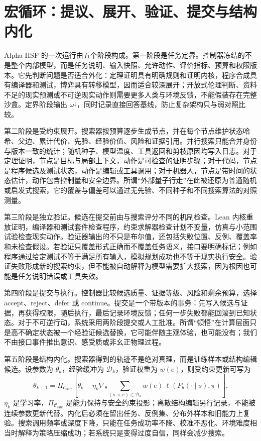 \section{宏循环：提议、展开、验证、提交与结构内化}
\label{sec:algorithmic_dynamics_macro_cycle}

Alpha-HSF 的一次运行由五个阶段构成。第一阶段是任务定界。控制器冻结的不是整个内部模型，而是任务说明、输入快照、允许动作、评价指标、预算和权限版本。它先判断问题是否适合外化：定理证明具有明确规则和证明内核，程序合成具有编译器和测试，博弈具有转移模型，因而适合较深展开；开放式伦理判断、资料不足的现实预测或不可逆现实动作则需要更多人类与环境反馈，不能假装存在完整沙盒。定界阶段输出 $\omega^{\downarrow}$，同时记录直接回答基线，防止复杂架构只与弱对照比较。

第二阶段是受约束展开。搜索器按预算逐步生成节点，并在每个节点维护状态哈希、父边、累计代价、先验、经验价值、风险和证据引用。并行搜索只能合并身份与版本一致的统计；随机种子、模型温度、工具返回和剪枝原因均写入日志。对于定理证明，节点是目标与局部上下文，动作是可检查的证明步骤；对于代码，节点是程序候选及测试状态，动作是编辑或工具调用；对于机器人，节点是带时间的状态估计，动作包含控制量和安全边界。所谓“外部量子行走”在此被还原为普通随机或启发式搜索，它的覆盖与偏差可以通过无先验、不同种子和不同搜索算法的对照测量。

第三阶段是独立验证。候选在提交前由与搜索评分不同的机制检查。Lean 内核重放证明，编译器和测试套件检查程序，约束求解器检查计划不变量，仿真与小范围试验检查现实动作。验证器输出的不只是布尔值，还包括失败位置、反例、覆盖率和未检查假设。若验证只覆盖形式正确而不覆盖任务语义，接口要明确标记；例如程序通过给定测试不等于满足所有输入，模拟规划成功也不等于现实执行安全。验证失败形成新的搜索约束，但不能被自动解释为模型需要扩大搜索，因为根因也可能是任务说明错误或工具失效。

第四阶段是提交与执行。控制器比较候选质量、证据等级、风险和剩余预算，选择 accept、reject、defer 或 continue。提交是一个带版本的事务：先写入候选与证据，再获得权限，随后执行，最后记录环境反馈；任何一步失败都能回滚到已知状态。对于不可逆行动，系统采用两阶段提交或人工批准。所谓“顿悟”在计算层面只是高不确定状态被一个经验证候选替换，它可能伴随主观体验，也可能没有；我们不由接口事件推出意识、感受质或非幺正物理过程。

第五阶段是结构内化。搜索器得到的轨迹不是绝对真理，而是训练样本或结构编辑候选。设参数为 $\theta_k$，经验缓冲为 $\mathcal{D}_k$，验证权重为 $w(e)$，则受约束更新可写为
\[
\theta_{k+1}=\Pi_{\mathcal{C}_{\mathrm{safe}}}
\left[\theta_k-\eta_k\nabla_{\theta}
\sum_{(s,\pi,e)\in\mathcal{D}_k}w(e)\,
\ell(P_{\theta}(\cdot\mid s),\pi)
\right].
\]
$\eta_k$ 是学习率，$\Pi_{\mathcal{C}_{\mathrm{safe}}}$ 是能力保持与安全约束投影；离散结构编辑另行记录，不能被连续参数更新代替。内化后必须在留出任务、反例集、分布外样本和旧能力上复验。搜索调用频率或深度下降，只能在任务成功率不降、校准不恶化、环境难度相当时解释为策略压缩成功；若系统只是变得过度自信，同样会减少搜索。

